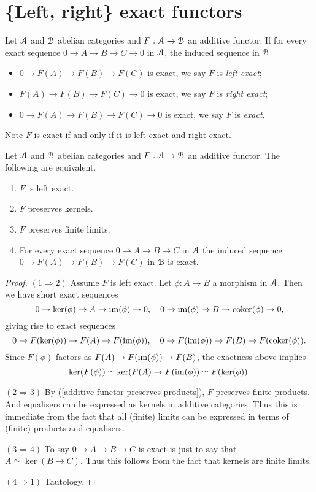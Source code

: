 \section{\{Left, right\} exact functors}

\begin{definition}
  \label{exactness}
  Let $\mathcal{A}$ and $\mathcal{B}$ abelian categories and $F : \mathcal{A} \to \mathcal{B}$ an
  additive functor. If for every exact sequence $0 \to A \to B \to C
  \to 0$ in $\mathcal{A}$, the induced sequence in $\mathcal{B}$
  \begin{itemize}
  \item $0 \to F(A) \to F(B) \to F(C)$ is exact, we say $F$ is
    \emph{left exact};
  \item $F(A) \to F(B) \to F(C) \to 0$ is exact, we say $F$ is
    \emph{right exact};
  \item $0 \to F(A) \to F(B) \to F(C) \to 0$ is exact, we say $F$ is
    \emph{exact}.
  \end{itemize}
  Note $F$ is exact if and only if it is left exact and right exact.
\end{definition}

\begin{lemma}
  \label{left-exact-equiv}
  Let $\mathcal{A}$ and $\mathcal{B}$ abelian categories and $F : \mathcal{A} \to \mathcal{B}$ an additive
  functor. The following are equivalent.
  \begin{enumerate}
  \item $F$ is left exact.
  \item $F$ preserves kernels.
  \item $F$ preserves finite limits.
  \item For every exact sequence $0 \to A \to B \to C$ in $\mathcal{A}$ the
    induced sequence $0 \to F(A) \to F(B) \to F(C)$ in $\mathcal{B}$ is exact.
  \end{enumerate}
\end{lemma}

\begin{proof}
  $(1 \Rightarrow 2)$ Assume $F$ is left exact. Let $\phi : A \to B$ a
  morphism in $\mathcal{A}$. Then we have short exact sequences
  \[
  0 \to \ker(\phi) \to A \to \operatorname{im}(\phi) \to 0, \quad 0 \to \operatorname{im}(\phi)
  \to B \to \operatorname{coker}(\phi) \to 0,
  \]
  giving rise to exact sequences
  \[
  0 \to F(\ker(\phi)) \to F(A) \to F(\operatorname{im}(\phi)), \quad 0 \to
  F(\operatorname{im}(\phi)) \to F(B) \to F(\operatorname{coker}(\phi)).
  \]
  Since $F(\phi)$ factors as $F(A) \to F(\operatorname{im}(\phi)) \to F(B)$, the
  exactness above implies
  \[
  \ker(F(\phi)) \simeq \ker(F(A) \to F(\operatorname{im}(\phi)) \simeq
  F(\ker(\phi)).
  \]

  \medskip
  $(2 \Rightarrow 3)$ By (\ref{additive-functor-preserves-products}),
  $F$ preserves finite products. And equalisers can be expressed as
  kernels in additive categories. Thus this is immediate from the fact
  that all (finite) limits can be expressed in terms of (finite)
  products and equalisers.

  \medskip
  $(3 \Rightarrow 4)$ To say $0 \to A \to B \to C$ is exact is just to
  say that $A \simeq \ker(B \to C)$. Thus this follows from the fact
  that kernels are finite limits.

  \medskip
  $(4 \Rightarrow 1)$ Tautology.
\end{proof}

